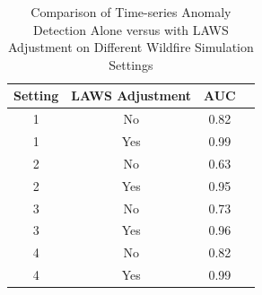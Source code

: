 \documentclass[11pt]{article}
\begin{document}
\begin{table}[htbp]
    \centering
    \begin{tabular}{|c|c|c|c|}
        \hline
        Setting  & LAWS Adjustment & AUC \\
        \hline
        1 & No & 0.82 \\
        1 & Yes & 0.99 \\
        2 & No & 0.63 \\
        2 & Yes & 0.95 \\
        3 & No & 0.73 \\
        3 & Yes & 0.96 \\
        4 & No & 0.82 \\
        4 & Yes & 0.99 \\
        \hline
    \end{tabular}
    \caption{Comparison of Time-series Anomaly Detection Alone versus with LAWS Adjustment on Different Wildfire Simulation Settings}
    \label{tab: simulation_wildfire}
\end{table}
\end{document}
